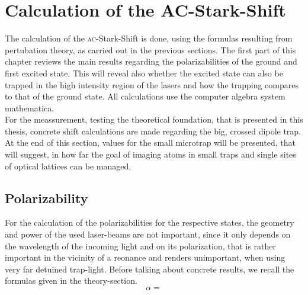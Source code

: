 \chapter{Calculation of the AC-Stark-Shift}

The calculation of the \textsc{ac}-Stark-Shift is done, using the formulas resulting from pertubation theory, as carried out in the previous sections. The first part of this chapter reviews the main results regarding the polarizabilities of the ground and first excited state. This will reveal also whether the excited state can also be trapped in the high intensity region of the lasers and how the trapping compares to that of the ground state. All calculations use the computer algebra system mathematica.\\For the meassurement, testing the theoretical foundation, that is presented in this thesis, concrete shift calculations are made regarding the big, crossed dipole trap. At the end of this section, values for the small microtrap will be presented, that will suggest, in how far the goal of imaging atoms in small traps and single sites of optical lattices can be managed.

\section{Polarizability}
For the calculation of the polarizabilities for the respective states, the geometry and power of the used laser-beams are not important, since it only depends on the wavelength of the incoming light and on its polarization, that is rather important in the vicinity of a reonance and renders unimportant, when using very far detuined trap-light. Before talking about concrete results, we recall the formulas given in the theory-section.
\begin{equation}
\alpha=
\end{equation}

